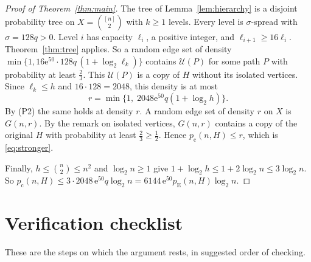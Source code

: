 \documentclass[11pt]{article}
\numberwithin{equation}{section}
\newcommand{\pc}{p_{\mathrm c}}
\newcommand{\pE}{p_{\mathrm E}}
\newcommand{\UU}{\mathcal U}
\newcommand{\ee}{\mathrm e}
\begin{document}
\begin{proof}[Proof of Theorem~\ref{thm:main}]
The tree of Lemma~\ref{lem:hierarchy} is a disjoint probability tree
on $X=\binom{[n]}2$ with $k\ge1$ levels. Every level is
$\sigma$-spread with $\sigma=128q>0$. Level $i$ has capacity $\ell_i$,
a positive integer, and $\ell_{i+1}\ge16\ell_i$.
Theorem~\ref{thm:tree} applies. So a random edge set of density
$\min\{1,16\ee^{50}\cdot128q\,(1+\log_2\ell_k)\}$ contains $\UU(P)$
for some path $P$ with probability at least $\frac23$. This $\UU(P)$
is a copy of $H$ without its isolated vertices. Since $\ell_k\le h$
and $16\cdot128=2048$, this density is at most
\[
 r=\min\{1,\;2048\ee^{50}q(1+\log_2 h)\}.
\]
By (P2) the same holds at density $r$. A random edge set of density
$r$ on $X$ is $G(n,r)$. By the remark on isolated vertices, $G(n,r)$
contains a copy of the original $H$ with probability at least
$\frac23\ge\frac12$. Hence $\pc(n,H)\le r$, which is
\eqref{eq:stronger}.

Finally, $h\le\binom n2\le n^2$ and $\log_2n\ge1$ give
$1+\log_2h\le1+2\log_2n\le3\log_2n$. So
$\pc(n,H)\le3\cdot2048\,\ee^{50}q\log_2n=6144\,\ee^{50}\pE(n,H)\log_2n$.
\end{proof}

\section{Verification checklist}\label{sec:checklist}

These are the steps on which the argument rests, in suggested order of
checking.
\end{document}
